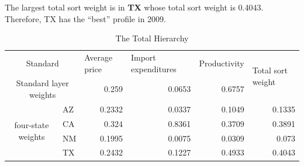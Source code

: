 The largest total sort weight is in \textbf{TX} whose total sort weight is 0.4043. Therefore, TX has the “best” profile in 2009.
\begin{table}[h]
	\centering
	\caption{The Total Hierarchy}
	\label{my-label}
	\begin{tabular}{|c|l|r|r|r|r|}
		\hline
		\multicolumn{2}{|c|}{Standard}               & \multicolumn{1}{l|}{Average price} & \multicolumn{1}{l|}{Import expenditures} & \multicolumn{1}{l|}{Productivity} & \multicolumn{1}{l|}{\multirow{2}{*}{Total sort weight}} \\ \cline{1-5}
		\multicolumn{2}{|c|}{Standard layer weights} & 0.259                              & 0.0653                                   & 0.6757                            & \multicolumn{1}{l|}{}                                   \\ \hline
		\multirow{4}{*}{four-state weights}   & AZ   & 0.2332                             & 0.0337                                   & 0.1049                            & 0.1335                                                  \\ \cline{2-6} 
		& CA   & 0.324                              & 0.8361                                   & 0.3709                            & 0.3891                                                  \\ \cline{2-6} 
		& NM   & 0.1995                             & 0.0075                                   & 0.0309                            & 0.073                                                   \\ \cline{2-6} 
		& TX   & 0.2432                             & 0.1227                                   & 0.4933                            & 0.4043                                                  \\ \hline
	\end{tabular}
\end{table}
